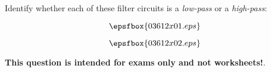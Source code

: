 

Identify whether each of these filter circuits is a {\it low-pass} or a {\it high-pass}:

\vskip 10pt

$$\epsfbox{03612x01.eps}$$







$$\epsfbox{03612x02.eps}$$







{\bf This question is intended for exams only and not worksheets!}.



